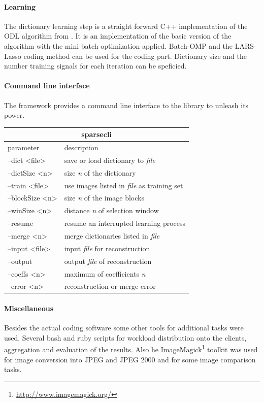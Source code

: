 \paragraph{Learning}
The dictionary learning step is a straight forward C++ implementation of the
ODL algorithm from . It is an
implementation of the
basic version of the algorithm with the mini-batch optimization applied.
Batch-OMP and the LARS-Lasso coding method can be used for the coding part.
Dictionary size and the number training signals for each iteration can be
speficied.

\paragraph{Command line interface}
The framework provides a command line interface to the library to unleash its
power.
%
\begin{table}[H]
\centering
\begin{tabular}{ |l | l |}
\hline
\multicolumn{2}{|c|}{sparsecli}\\
\hline
parameter & description \\
\hline
--dict <file> & save or load dictionary to \emph{file}\\
--dictSize <n> & size \emph{n} of the dictionary  \\
--train <file> & use images listed in \emph{file} as training set\\
--blockSize <n> & size \emph{n} of the image blocks \\
--winSize <n> & distance \emph{n} of selection window \\
--resume & resume an interrupted learning process \\
--merge <n> & merge dictionaries listed in \emph{file}  \\
--input <file> & input \emph{file} for reconstruction \\
--output & output \emph{file} of reconstruction \\ 
--coeffs <n> & maximum of coefficients \emph{n} \\
--error <n> & reconstruction or merge error \\

\hline
\end{tabular}
\end{table}

\paragraph{Miscellaneous}
Besides the actual coding software some other tools for
additional tasks were used. Several bash and ruby scripts for workload
distribution onto the clients, aggregation and evaluation of the results.
Also he ImageMagick\footnote{\url{http://www.imagemagick.org/}} toolkit was used
for image conversion into JPEG and JPEG 2000 and for some image comparison
tasks.


